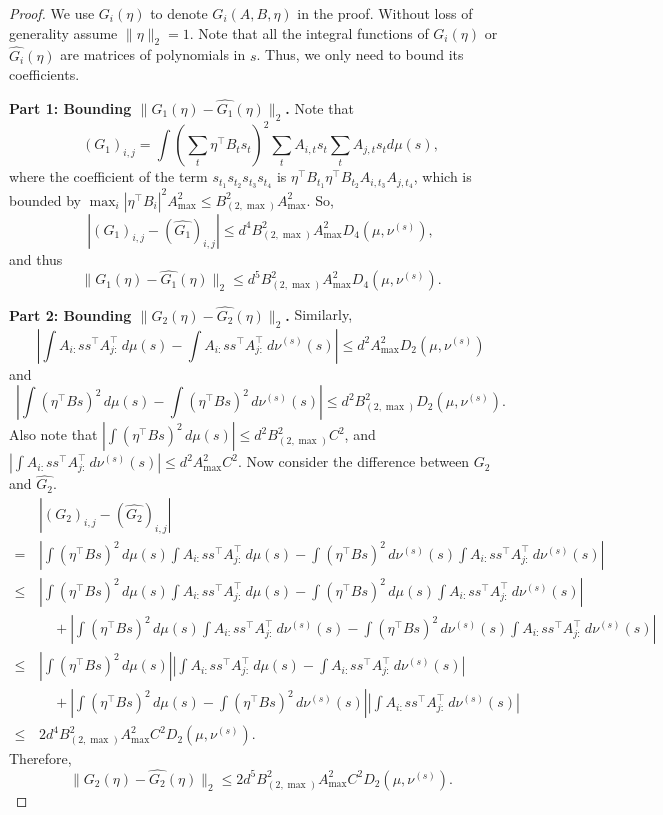 \begin{proof}
	We use $G_i(\eta)$ to denote $G_i(A,B,\eta)$ in the proof.
	Without loss of generality assume $\|\eta\|_2 = 1$.
	Note that all the integral functions of $G_i(\eta)$ or $\widehat{G_i}(\eta)$ are matrices of polynomials in $s$. 
	Thus, we only need to bound its coefficients.
	
	{\bf Part 1: Bounding $\|G_1(\eta) - \widehat{G_1}(\eta)\|_2$. } Note that 
	\[
	\left(G_1\right)_{i,j} = \int (\sum_t \eta^{\top}B_ts_t)^2\sum_t A_{i,t}s_t \sum_t A_{j,t}s_t d\mu(s),
	\]
	where the coefficient of the term $s_{t_1}s_{t_2}s_{t_3}s_{t_4}$ is $\eta^{\top}B_{t_1}\eta^{\top}B_{t_2}A_{i,t_3}A_{j,t_4}$, 
	which is bounded by $\max_i |\eta^{\top} B_i|^2 A_{\max}^2 \le B_{(2,\max)}^2A_{\max}^2$. 
	So,
	\[
	\left| (G_1)_{i,j} - (\hat{G_1})_{i,j} \right| \le d^4  B_{(2,\max)}^2A_{\max}^2D_4(\mu, \nu^{(s)}),
	\]
	and thus
	\[
	\|G_1(\eta) - \widehat{G_1}(\eta)\|_2 \le  d^5  B_{(2,\max)}^2A_{\max}^2D_4(\mu, \nu^{(s)}).
	\]
	
	{\bf Part 2: Bounding $\|G_2(\eta) - \widehat{G_2}(\eta)\|_2$. }
	Similarly, 
	\[
	\left| \int A_{i:}ss^{\top}A_{j:}^{\top} \,d\mu(s) - \int A_{i:}ss^{\top}A_{j:}^{\top} \,d\nu^{(s)}(s) \right| \le d^2 A_{\max}^2 D_2(\mu,\nu^{(s)})
	\]
	and 
	\[
	\left| \int (\eta^{\top}Bs)^2\,d\mu(s) -\int (\eta^{\top}Bs)^2\,d\nu^{(s)}(s) \right| \le d^2 B_{(2,\max)}^2 D_2(\mu,\nu^{(s)}).
	\]
	Also note that $ \left| \int (\eta^{\top}Bs)^2\,d\mu(s) \right| \le d^2B_{(2,\max)}^2 C^2$, and
	$\left| \int A_{i:}ss^{\top}A_{j:}^{\top} \,d\nu^{(s)}(s) \right| \le d^2A_{\max}^2 C^2$.
	Now consider the difference between $G_2$ and $\hat{G_2}$. 
	\begin{align*}
	& \left| (G_2)_{i,j} - (\hat{G_2})_{i,j} \right| \\
	=\, & \left| \int (\eta^{\top}Bs)^2\,d\mu(s) \int A_{i:}ss^{\top}A_{j:}^{\top} \,d\mu(s)  - 
	\int (\eta^{\top}Bs)^2\,d\nu^{(s)}(s) \int A_{i:}ss^{\top}A_{j:}^{\top} \,d\nu^{(s)}(s) \right| \\
	\le \, & \left| \int (\eta^{\top}Bs)^2\,d\mu(s) \int A_{i:}ss^{\top}A_{j:}^{\top} \,d\mu(s)  - 
	\int (\eta^{\top}Bs)^2\,d\mu(s) \int A_{i:}ss^{\top}A_{j:}^{\top} \,d\nu^{(s)}(s) \right| \\ 
	& \quad + \left| \int (\eta^{\top}Bs)^2\,d\mu(s) \int A_{i:}ss^{\top}A_{j:}^{\top} \,d\nu^{(s)}(s)  - 
	\int (\eta^{\top}Bs)^2\,d\nu^{(s)}(s) \int A_{i:}ss^{\top}A_{j:}^{\top} \,d\nu^{(s)}(s) \right| \\
	\le\, & \left| \int (\eta^{\top}Bs)^2\,d\mu(s) \right| \left|\int A_{i:}ss^{\top}A_{j:}^{\top} \,d\mu(s) - \int A_{i:}ss^{\top}A_{j:}^{\top} \,d\nu^{(s)}(s) \right| \\
	& \quad + \left| \int (\eta^{\top}Bs)^2\,d\mu(s) -\int (\eta^{\top}Bs)^2\,d\nu^{(s)}(s) \right| \left| \int A_{i:}ss^{\top}A_{j:}^{\top} \,d\nu^{(s)}(s) \right| \\
	\le\, & 2 d^4  B_{(2,\max)}^2A_{\max}^2C^2D_2(\mu, \nu^{(s)}).
	\end{align*}
	Therefore,
	\[
	\|G_2(\eta) - \widehat{G_2}(\eta)\|_2 \le 2 d^5  B_{(2,\max)}^2A_{\max}^2C^2D_2(\mu, \nu^{(s)}).
	\]
	

\end{proof}
